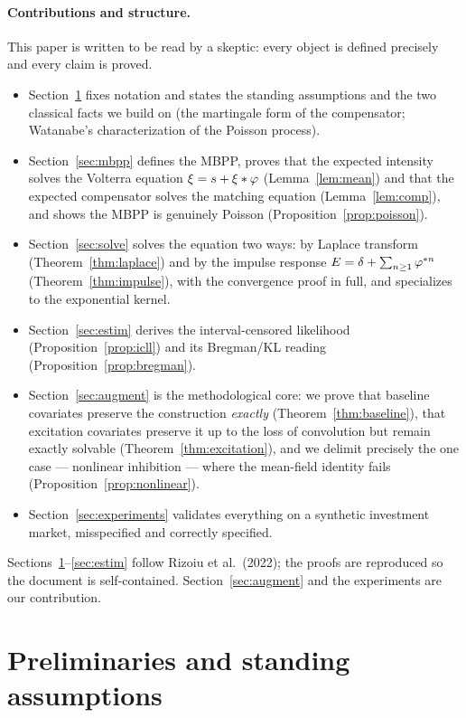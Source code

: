\documentclass[11pt]{article}
\theoremstyle{plain}
\theoremstyle{definition}
\theoremstyle{remark}
\begin{document}
\paragraph{Contributions and structure.}
This paper is written to be read by a skeptic: every object is defined precisely
and every claim is proved.
\begin{itemize}[leftmargin=1.4em,itemsep=2pt]
\item Section~\ref{sec:prelim} fixes notation and states the standing assumptions
and the two classical facts we build on (the martingale form of the compensator;
Watanabe's characterization of the Poisson process).
\item Section~\ref{sec:mbpp} defines the MBPP, proves that the expected intensity
solves the Volterra equation $\xi=s+\xi\ast\varphi$ (Lemma~\ref{lem:mean}) and
that the expected compensator solves the matching equation (Lemma~\ref{lem:comp}),
and shows the MBPP is genuinely Poisson (Proposition~\ref{prop:poisson}).
\item Section~\ref{sec:solve} solves the equation two ways: by Laplace transform
(Theorem~\ref{thm:laplace}) and by the impulse response
$E=\delta+\sum_{n\ge1}\varphi^{\ast n}$ (Theorem~\ref{thm:impulse}), with the
convergence proof in full, and specializes to the exponential kernel.
\item Section~\ref{sec:estim} derives the interval-censored likelihood
(Proposition~\ref{prop:icll}) and its Bregman/KL reading
(Proposition~\ref{prop:bregman}).
\item Section~\ref{sec:augment} is the methodological core: we prove that baseline
covariates preserve the construction \emph{exactly}
(Theorem~\ref{thm:baseline}), that excitation covariates preserve it up to the
loss of convolution but remain exactly solvable
(Theorem~\ref{thm:excitation}), and we delimit precisely the one case ---
nonlinear inhibition --- where the mean-field identity fails
(Proposition~\ref{prop:nonlinear}).
\item Section~\ref{sec:experiments} validates everything on a synthetic
investment market, misspecified and correctly specified.
\end{itemize}
Sections~\ref{sec:prelim}--\ref{sec:estim} follow Rizoiu et al.\ (2022); the
proofs are reproduced so the document is self-contained. Section~\ref{sec:augment}
and the experiments are our contribution.

\section{Preliminaries and standing assumptions}
\label{sec:prelim}
\end{document}
